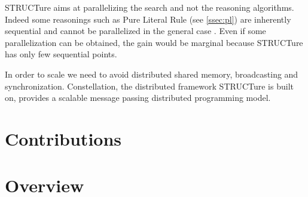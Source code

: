 STRUCTure aims at parallelizing the search and not the reasoning
algorithms. Indeed some reasonings such as Pure Literal Rule (see
\ref{ssec:pl}) are inherently sequential and cannot be parallelized
in the general case \cite{Johannsen:2005:CPL:1166822.1166834}. Even
if some parallelization can be obtained, the gain would be marginal
because STRUCTure has only few sequential points.

In order to scale we need to avoid distributed shared memory,
broadcasting and synchronization. Constellation, the distributed
framework STRUCTure is built on, provides a scalable message passing
distributed programming model.

\section{Contributions}

\section{Overview}

